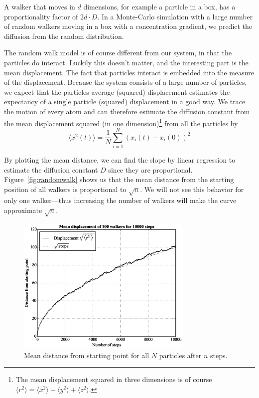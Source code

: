 \documentclass[11pt]{article}
\numberwithin{equation}{section}
\numberwithin{figure}{section}
\begin{document}
A walker that moves in $d$ dimensions, for example a particle in a box,
has a proportionality factor of $2 d\cdot D$.
In a Monte-Carlo simulation with a large number of
random walkers moving in a box with a concentration gradient,
we predict the diffusion from the random distribution.

The random walk model is of course different from our system,
in that the particles do interact. Luckily this doesn't matter,
and the interesting part is the mean displacement.
The fact that particles interact is embedded into 
the measure of the displacement.
Because the system consists of a large number of particles,
we expect that the particles average (squared) displacement
estimates the expectancy of a single particle (squared) displacement
in a good way.
We trace the motion of every atom and can therefore estimate the
diffusion constant from the mean displacement squared 
(in one dimension)\footnote{The mean displacement squared in three
    dimensions is of course
    $\langle r^2 \rangle 
    = \langle x^2 \rangle + \langle y^2 \rangle + \langle z^2 \rangle$.
}
from all the particles by
\begin{equation}
    \langle x^2(t)\rangle 
    = \frac{1}{N}\sum_{i=1}^N {(x_i(t)-x_i(0))}^2
\end{equation}

By plotting the mean distance, we can find the slope by linear regression
to estimate the diffusion constant $D$ since they are proportional. 
Figure~\ref{fig:randomwalk} shows us that the mean distance from the starting
position of all walkers is proportional to 
$\sqrt n$. We will not see this behavior
for only one walker---thus increasing the number of walkers
will make the curve approximate $\sqrt n$.

\begin{figure}[h]
    \centering
    \includegraphics[width=0.75\textwidth]{figures/md-figures/random-walk-mean-distance.eps}    
    \caption{Mean distance from starting point for all $N$ particles
        after $n$ steps.}
\end{figure}\label{fig:randomwalk}
\end{document}
